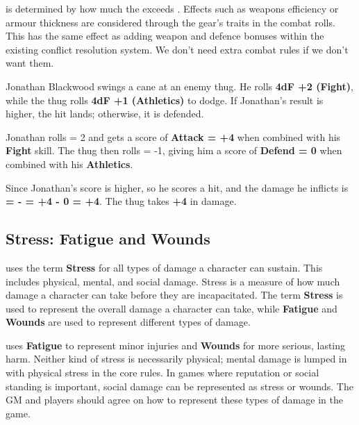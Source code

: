 \Damage is determined by how much the \Attack exceeds \Defend. Effects such as weapons efficiency or armour thickness are considered through the gear's traits in the combat rolls. This has the same effect as adding weapon and defence bonuses within the existing conflict resolution system. We don't need extra combat rules if we don't want them.

\begin{WyrdExample}
	Jonathan Blackwood swings a cane at an enemy thug. He rolls \textbf{4dF +2 (Fight)}, while the thug rolls \textbf{4dF +1 (Athletics)} to dodge. If Jonathan’s result is higher, the hit lands; otherwise, it is defended.
	
	Jonathan rolls \FudgeRes{+++-} = 2 and gets a score of \textbf{Attack = +4} when combined with his \textbf{Fight} skill. The thug then rolls  = -1, giving him a score of \textbf{Defend = 0} when combined with his \textbf{Athletics}.
	
	Since Jonathan's score is higher, so he scores a hit, and the damage he inflicts is \textbf{\Damage = \Attack - \Defend = +4 - 0 = +4}. The thug takes \textbf{+4} in damage.
\end{WyrdExample}


\subsection{Stress: Fatigue  and Wounds}

\wyrd uses the term \textbf{Stress} for all types of damage a character can sustain. This includes physical, mental, and social damage. Stress is a measure of how much damage a character can take before they are incapacitated. The term \textbf{Stress} is used to represent the overall damage a character can take, while \textbf{Fatigue} and \textbf{Wounds} are used to represent different types of damage.

\wyrd uses \textbf{Fatigue} to represent minor injuries and \textbf{Wounds} for more serious, lasting harm. Neither kind of stress is necessarily physical; mental damage is lumped in with physical stress in the core rules. In games where reputation or social standing is important, social damage can be represented as stress or wounds. The GM and players should agree on how to represent these types of damage in the game.

